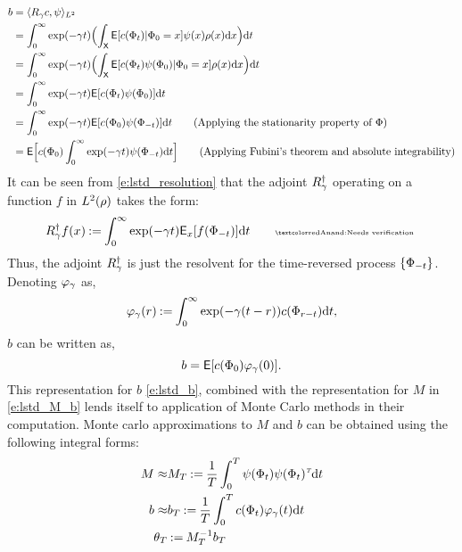 \begin{equation}
\begin{aligned}
b & = \langle R_\discount c, \basis \rangle_{L^2} \\
& = \int_0^\infty \exp(-\discount t)  \Bigl(\int_{\state} \Expect[c(\markovstate_t)| \markovstate_0 = x] \basis(x)  \pr(x) \ud x \Bigr) \ud t \\
& = \int_0^\infty \exp(-\discount t)  \Bigl(\int_{\state} \Expect[c(\markovstate_t) \basis(\markovstate_0)| \markovstate_0 = x]  \pr(x) \ud x \Bigr) \ud t \\
& = \int_0^\infty \exp(-\discount t) \Expect[c(\markovstate_t) \basis(\markovstate_0)]\ud t \\
& = \int_0^\infty \exp(-\discount t) \Expect[c(\markovstate_0) \basis(\markovstate_{-t})] \ud t \qquad \text{(Applying the stationarity property of $\markovstate$)}\\
& = \Expect\Bigl[c(\markovstate_0) \int_0^\infty \exp(-\discount t) \basis(\markovstate_{-t})\ud t\Bigr]  \qquad \text{(Applying Fubini's theorem and absolute integrability)}
\label{e:lstd_resolution}
\end{aligned}
\end{equation}
It can be seen from \eqref{e:lstd_resolution} that the adjoint $R^\dagger_\gamma$ operating on a function $f$ in $L^2(\rho)$ takes the form:
\[
R^\dagger_\discount f(x) \eqdef \int_0^\infty \exp(-\discount t ) \Expect_x[f(\markovstate_{-t})] \ud t \qquad \text{\anand{Needs verification}}
\]
Thus, the adjoint $R^\dagger_\gamma$ is just the resolvent for the time-reversed process $\{\Phi_{-t}\}$. 
Denoting $\varphi_\gamma$ as,
\begin{equation}
\eligibvector_\discount(r) \eqdef \int_0^\infty \exp(-\discount (t -r)) c(\markovstate_{r-t}) \ud t,
\label{e:lstd_eligib}
\end{equation}
$b$ can be written as,
\begin{equation}
b = \Expect[c(\markovstate_0) \eligibvector_\discount(0)].
\label{e:lstd_b}
\end{equation}
This representation for $b$ \eqref{e:lstd_b}, combined with the representation for $M$ in \eqref{e:lstd_M_b} lends itself to application of Monte Carlo methods in their computation. Monte carlo approximations to $M$ and $b$ can be obtained using the following integral forms:
\begin{subequations}
\begin{align}
M \approx &M_T   \eqdef \frac{1}{T} \int_0^T  \basis(\markovstate_t) \basis(\markovstate_t)^\transpose \ud t
\label{e:lstd_M_T}
\\
b \approx & b_T  \eqdef \frac{1}{T} \int_0^T c(\markovstate_t) \eligibvector_\discount(t) \ud t
\label{e:lstd_b_T}
\\
\param_T &\eqdef  M_T^{-1} b_T
\label{e:lstd_theta_T}
\end{align}
\end{subequations}

